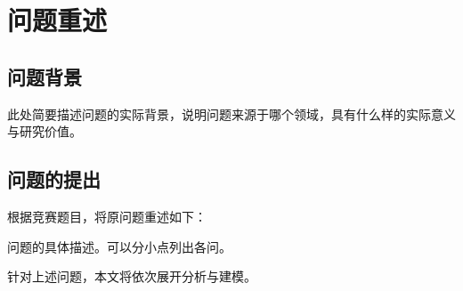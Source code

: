 
\section{问题重述}

\subsection{问题背景}

此处简要描述问题的实际背景，说明问题来源于哪个领域，具有什么样的实际意义与研究价值。

\subsection{问题的提出}

根据竞赛题目，将原问题重述如下：

\begin{problem}
	问题的具体描述。可以分小点列出各问。
	\label{pro:example}
\end{problem}

针对上述问题，本文将依次展开分析与建模。
